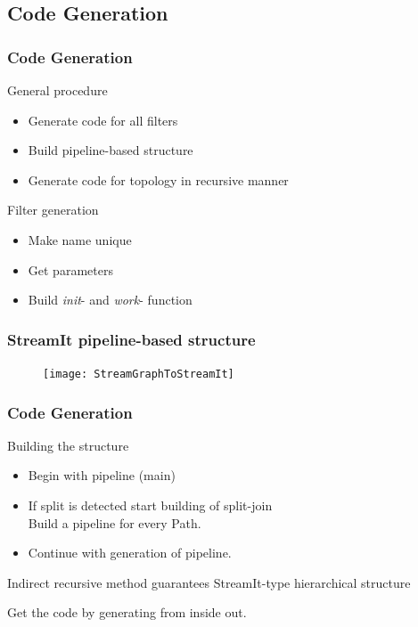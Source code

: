 \documentclass{beamer}
\begin{document}
\subsection{Code Generation}
\begin{frame}
\frametitle{Code Generation}
	\begin{block}{General procedure}
		\begin{itemize}
			\item Generate code for all filters
			\item Build pipeline-based structure
			\item Generate code for topology in recursive manner
		\end{itemize}
	\end{block}
	\begin{block}{Filter generation}
		\begin{itemize}
			\item Make name unique
			\item Get parameters
			\item Build \textit{init}- and \textit{work}- function
		\end{itemize}
	\end{block}
\end{frame}

\begin{frame}
\frametitle{StreamIt pipeline-based structure}
	\begin{figure}[h]
		\centering
		\texttt{[image: StreamGraphToStreamIt]}
		\label{fig_StreamGraph_To_StreamIt}
	\end{figure}
\end{frame}


\begin{frame}
\frametitle{Code Generation}
	\begin{block}{Building the structure}
		\begin{itemize}
			\item Begin with pipeline (main)
			\item If split is detected start building of split-join\\
				\quad Build a pipeline for every Path.
			\item Continue with generation of pipeline.
		\end{itemize}
		Indirect recursive method guarantees StreamIt-type hierarchical structure
	\end{block}
	Get the code by generating from inside out.
\end{frame}
\end{document}
